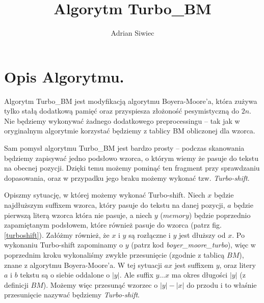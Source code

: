 \documentclass[12pt]{article}
\newcommand{\TBM}{Turbo\_BM }
\theoremstyle{plain}
\begin{document}
\title{Algorytm \TBM}
\author{Adrian Siwiec}
\maketitle

\section*{Opis Algorytmu.}
Algorytm \TBM jest modyfikacją algorytmu Boyera-Moore'a, która zużywa tylko stałą dodatkową pamięć oraz przyspiesza złożoność pesymistyczną do $2n$. Nie będziemy wykonywać żadnego dodatkowego preprocessingu -- tak jak w oryginalnym algorytmie korzystać będziemy z tablicy BM obliczonej dla wzorca.
  
Sam pomysł algorytmu \TBM jest bardzo prosty -- podczas skanowania będziemy zapisywać jedno podsłowo wzorca, o którym wiemy że pasuje do tekstu na obecnej pozycji. Dzięki temu możemy pominąć ten fragment przy sprawdzaniu dopasowania, oraz w przypadku jego braku możemy wykonać tzw. \emph{Turbo-shift}.

Opiszmy sytuację, w której możemy wykonać Turbo-shift. Niech $x$ będzie najdłuższym suffixem wzorca, który pasuje do tekstu na danej pozycji, $a$ będzie pierwszą literą wzorca która nie pasuje, a niech $y$ ($memory$) będzie poprzednio zapamiętanym podsłowem, które również pasuje do wzorca (patrz fig. \ref{turboshift}). Załóżmy również, że $x$ i $y$ są rozłączne i $y$ jest dłuższy od $x$. Po wykonaniu Turbo-shift zapominamy o $y$ (patrz kod \emph{boyer\_moore\_turbo}), więc w poprzednim kroku wykonaliśmy zwykłe przesunięcie (zgodnie z tablicą $BM$), znane z algorytmu Boyera-Moore'a. W tej sytuacji $ax$ jest suffixem $y$, oraz litery $a$ i $b$ tekstu są o siebie oddalone o $|y|$. Ale suffix $y\ldots x$ ma okres długości $|y|$ (z definicji $BM$). Możemy więc przesunąć wzorzec o $|y| - |x|$ do przodu i to właśnie przesunięcie nazywać będziemy \emph{Turbo-shift}.

\end{document}
